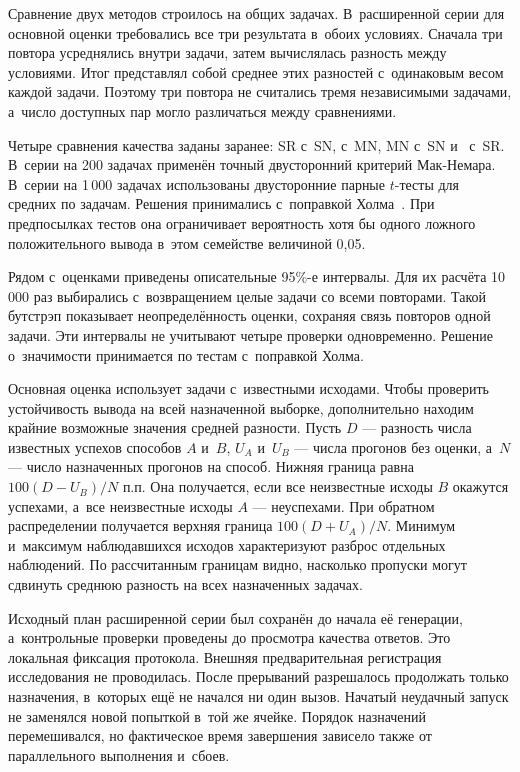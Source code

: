 Сравнение двух методов строилось на общих задачах. В~расширенной серии для основной оценки требовались все три результата в~обоих условиях. Сначала три повтора усреднялись внутри задачи, затем вычислялась разность между условиями. Итог представлял собой среднее этих разностей с~одинаковым весом каждой задачи. Поэтому три повтора не считались тремя независимыми задачами, а~число доступных пар могло различаться между сравнениями.

Четыре сравнения качества заданы заранее: SR с~SN, \MultiCallRole{} с~MN, MN с~SN и~\MultiCallRole{} с~SR. В~серии на 200 задачах применён точный двусторонний критерий Мак-Немара. В~серии на 1\,000 задачах использованы двусторонние парные $t$-тесты для средних по задачам. Решения принимались с~поправкой Холма~\cite{holm1979}. При предпосылках тестов она ограничивает вероятность хотя бы одного ложного положительного вывода в~этом семействе величиной 0,05.

Рядом с~оценками приведены описательные 95\%-е интервалы. Для их расчёта 10\,000 раз выбирались с~возвращением целые задачи со всеми повторами. Такой бутстрэп показывает неопределённость оценки, сохраняя связь повторов одной задачи. Эти интервалы не учитывают четыре проверки одновременно. Решение о~значимости принимается по тестам с~поправкой Холма.

Основная оценка использует задачи с~известными исходами. Чтобы проверить устойчивость вывода на всей назначенной выборке, дополнительно находим крайние возможные значения средней разности. Пусть $D$ --- разность числа известных успехов способов $A$ и~$B$, $U_A$ и~$U_B$ --- числа прогонов без оценки, а~$N$ --- число назначенных прогонов на способ. Нижняя граница равна $100(D-U_B)/N$ п.п. Она получается, если все неизвестные исходы $B$ окажутся успехами, а~все неизвестные исходы $A$ --- неуспехами. При обратном распределении получается верхняя граница $100(D+U_A)/N$. Минимум и~максимум наблюдавшихся исходов характеризуют разброс отдельных наблюдений. По рассчитанным границам видно, насколько пропуски могут сдвинуть среднюю разность на всех назначенных задачах.

Исходный план расширенной серии был сохранён до начала её генерации, а~контрольные проверки проведены до просмотра качества ответов. Это локальная фиксация протокола. Внешняя предварительная регистрация исследования не проводилась. После прерываний разрешалось продолжать только назначения, в~которых ещё не начался ни один вызов. Начатый неудачный запуск не заменялся новой попыткой в~той же ячейке. Порядок назначений перемешивался, но фактическое время завершения зависело также от параллельного выполнения и~сбоев.

